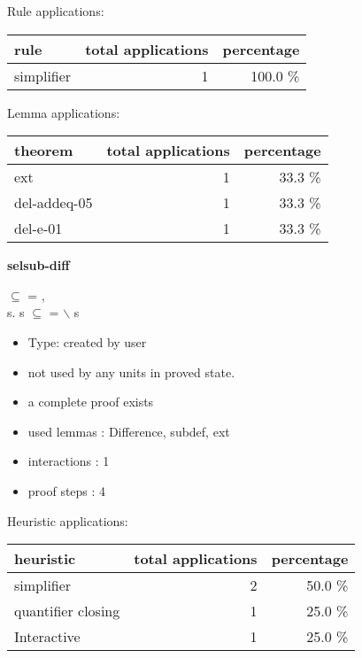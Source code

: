\documentclass[a4paper]{article}
\begin{document}
Rule applications:

\begin{supertabular}{l|r|r}
rule	        & total applications & percentage \\ \hline
simplifier & 1 & 100.0 \% \\

\end{supertabular}

Lemma applications:

\begin{supertabular}{l|r|r}
theorem	        & total applications & percentage \\ \hline
ext & 1 & 33.3 \% \\
del-addeq-05 & 1 & 33.3 \% \\
del-e-01 & 1 & 33.3 \% \\

\end{supertabular}
\pagebreak

{\LARGE\bf selsub-diff}\label{lemma-selsub-diff}

\medskip

 $\subseteq$  \Fol {} = , \\
\Ex s. s $\subseteq$  \And {} =  $\backslash$ s

\begin{itemize}

\item Type: created by user

\item not used by any units in proved state.
\item       a complete proof exists
\item       used lemmas  : Difference, subdef, ext
\item       interactions : 1
\item       proof steps  : 4
\end{itemize}

\medskip


Heuristic applications:

\begin{supertabular}{l|r|r}
heuristic	& total applications & percentage \\ \hline
simplifier & 2 & 50.0 \% \\
quantifier closing & 1 & 25.0 \% \\
Interactive & 1 & 25.0 \% \\

\end{supertabular}
\end{document}
